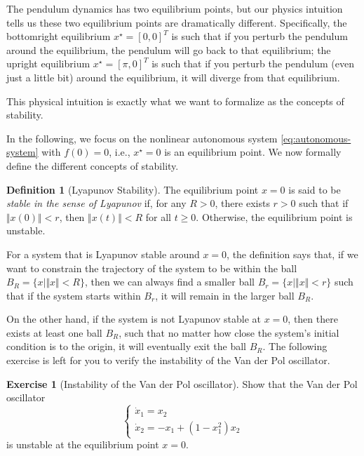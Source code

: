\documentclass[
]{book}
\theoremstyle{definition}
\newtheorem{definition}{Definition}[chapter]
\theoremstyle{definition}
\theoremstyle{definition}
\newtheorem{exercise}{Exercise}[chapter]
\theoremstyle{definition}
\theoremstyle{remark}
\begin{document}
The pendulum dynamics has two equilibrium points, but our physics intuition tells us these two equilibrium points are dramatically different. Specifically, the bottomright equilibrium \(x^\star = [0,0]^T\) is such that if you perturb the pendulum around the equilibrium, the pendulum will go back to that equilibrium; the upright equilibrium \(x^\star = [\pi,0]^T\) is such that if you perturb the pendulum (even just a little bit) around the equilibrium, it will diverge from that equilibrium.

This physical intuition is exactly what we want to formalize as the concepts of stability.

In the following, we focus on the nonlinear autonomous system \eqref{eq:autonomous-system} with \(f(0) = 0\), i.e., \(x^\star = 0\) is an equilibrium point. We now formally define the different concepts of stability.

\begin{definition}[Lyapunov Stability]
\protect\hypertarget{def:lyapunovstability}{}\label{def:lyapunovstability}The equilibrium point \(x=0\) is said to be \emph{stable in the sense of Lyapunov} if, for any \(R > 0\), there exists \(r >0\) such that if \(\Vert x(0) \Vert < r\), then \(\Vert x(t) \Vert < R\) for all \(t \geq 0\). Otherwise, the equilibrium point is unstable.
\end{definition}

For a system that is Lyapunov stable around \(x=0\), the definition says that, if we want to constrain the trajectory of the system to be within the ball \(B_R = \{ x \mid \Vert x \Vert < R \}\), then we can always find a smaller ball \(B_r = \{ x \mid \Vert x \Vert < r \}\) such that if the system starts within \(B_r\), it will remain in the larger ball \(B_R\).

On the other hand, if the system is not Lyapunov stable at \(x=0\), then there exists at least one ball \(B_R\), such that no matter how close the system's initial condition is to the origin, it will eventually exit the ball \(B_R\). The following exercise is left for you to verify the instability of the Van der Pol oscillator.

\begin{exercise}[Instability of the Van der Pol oscillator]
\protect\hypertarget{exr:instabilityvanderpol}{}\label{exr:instabilityvanderpol}Show that the Van der Pol oscillator
\[
\begin{cases}
\dot{x}_1 = x_2 \\
\dot{x}_2 = - x_1 + (1-x_1^2) x_2
\end{cases}
\]
is unstable at the equilibrium point \(x = 0\).
\end{exercise}
\end{document}
